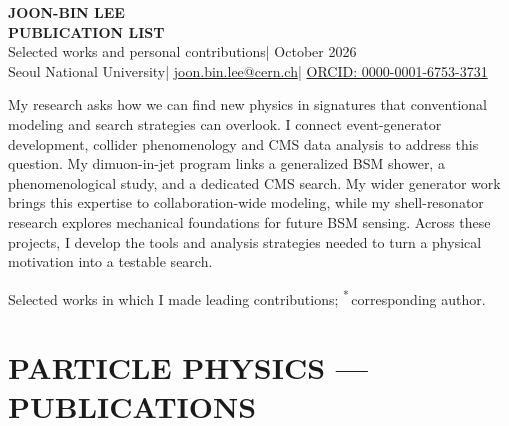 \documentclass[11pt,a4paper]{article}
\newif\ifhighlightcontributions
\newcommand{\corr}{\textsuperscript{*}}
\newcommand{\keycontribution}[1]{\ifhighlightcontributions\textbf{#1}\else#1\fi}
\begin{document}
\begin{center}
  {\fontsize{17pt}{19pt}\selectfont\bfseries JOON-BIN LEE}\\[2pt]
  {\fontsize{11.5pt}{13pt}\selectfont\bfseries PUBLICATION LIST}\\[2pt]
  {\fontsize{10pt}{11.5pt}\selectfont Selected works and personal contributions\quad| October 2026}\\[3pt]
  {\fontsize{9.5pt}{11pt}\selectfont Seoul National University\quad|\quad
  \href{mailto:joon.bin.lee@cern.ch}{joon.bin.lee@cern.ch}\quad|\quad
  \href{https://orcid.org/0000-0001-6753-3731}{ORCID: 0000-0001-6753-3731}}
\end{center}
\vspace{-3pt}

{\fontsize{10.5pt}{12.5pt}\selectfont
My research asks \keycontribution{how we can find new physics in signatures that conventional modeling and search strategies can overlook}. I \keycontribution{connect event-generator development, collider phenomenology and CMS data analysis} to address this question. My dimuon-in-jet program links a generalized BSM shower, a phenomenological study, and a dedicated CMS search. My wider generator work brings this expertise to collaboration-wide modeling, while my shell-resonator research explores mechanical foundations for future BSM sensing. Across these projects, I develop the tools and analysis strategies needed to turn a physical motivation into a testable search.\par}
\vspace{4pt}
{\fontsize{9pt}{10.5pt}\selectfont\color{cvgrey}
Selected works in which I made leading contributions; \corr\,corresponding author.\par}

\section*{PARTICLE PHYSICS --- PUBLICATIONS}
\end{document}
